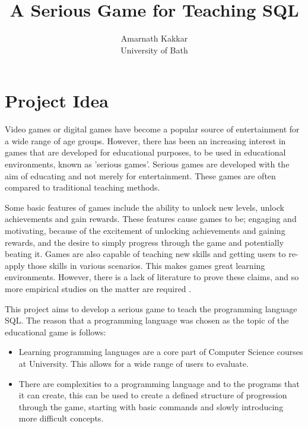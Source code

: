 \documentclass[11pt, oneside]{article}   	%
\title{
A Serious Game for Teaching SQL
}
\author{
Amarnath Kakkar \\
\normalsize University of Bath
}
\begin{document}
\maketitle

\newpage
\tableofcontents

\newpage
\section{Project Idea}

Video games or digital games have become a popular source of entertainment for a wide range of age groups. However, there has been an increasing interest in games that are developed for educational purposes, to be used in educational environments, known as 'serious games'. Serious games are developed with the aim of educating and not merely for entertainment. These games are often compared to traditional teaching methods.

Some basic features of games include the ability to unlock new levels, unlock achievements and gain rewards. These features cause games to be; engaging and motivating, because of the excitement of unlocking achievements and gaining rewards, and the desire to simply progress through the game and potentially beating it. Games are also capable of teaching new skills and getting users to re-apply those skills in various scenarios. This makes games great learning environments. However, there is a lack of literature to prove these claims, and so more empirical studies on the matter are required \cite{MetaAnalysis}.

This project aims to develop a serious game to teach the programming language SQL. The reason that a programming language was chosen as the topic of the educational game is follows:

\begin{itemize}
\item Learning programming languages are a core part of Computer Science courses at University. This allows for a wide range of users to evaluate. 
\item There are complexities to a programming language and to the programs that it can create, this can be used to create a defined structure of progression through the game, starting with basic commands and slowly introducing more difficult concepts.
\end{itemize}
\end{document}
